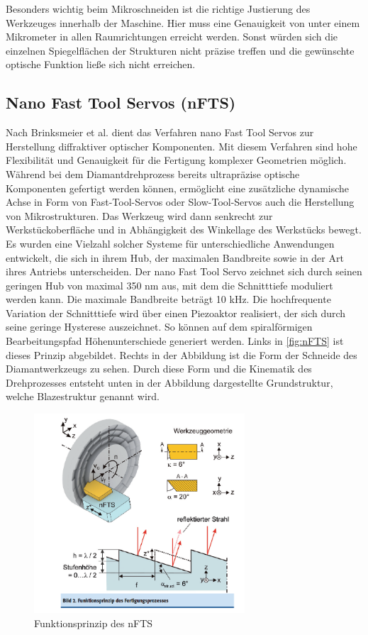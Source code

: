 \documentclass[12pt,a4paper,bibliography=totocnumbered,listof=totocnumbered]{scrartcl}
\begin{document}
\break
Besonders wichtig beim Mikroschneiden ist die richtige Justierung des Werkzeuges innerhalb der Maschine. Hier muss eine Genauigkeit von unter einem Mikrometer in allen Raumrichtungen erreicht werden. Sonst würden sich die einzelnen Spiegelflächen der Strukturen nicht präzise treffen und die gewünschte optische Funktion ließe sich nicht erreichen.




\subsection{Nano Fast Tool Servos (nFTS)}
Nach Brinksmeier et al. \cite{Diadreh} dient das Verfahren nano Fast Tool Servos zur Herstellung diffraktiver optischer Komponenten. Mit diesem Verfahren sind hohe Flexibilität und Genauigkeit für die Fertigung komplexer Geometrien möglich. 
Während bei dem Diamantdrehprozess bereits ultrapräzise optische Komponenten gefertigt werden können, ermöglicht eine zusätzliche dynamische Achse in Form von Fast-Tool-Servos oder Slow-Tool-Servos auch die Herstellung von Mikrostrukturen. Das Werkzeug wird dann senkrecht zur Werkstückoberfläche und in Abhängigkeit des Winkellage des Werkstücks bewegt. Es wurden eine Vielzahl solcher Systeme für unterschiedliche Anwendungen entwickelt, die sich in ihrem Hub, der maximalen Bandbreite sowie in der Art ihres Antriebs unterscheiden. Der nano Fast Tool Servo zeichnet sich durch seinen geringen Hub von maximal 350 nm aus, mit dem die Schnitttiefe moduliert werden kann. Die maximale Bandbreite beträgt 10 kHz. Die hochfrequente Variation der Schnitttiefe wird über einen Piezoaktor realisiert, der sich durch seine geringe Hysterese auszeichnet. So können auf dem spiralförmigen Bearbeitungspfad Höhenunterschiede generiert werden. Links in \autoref{fig:nFTS} ist dieses Prinzip abgebildet. Rechts in der Abbildung ist die Form der Schneide des Diamantwerkzeugs zu sehen. Durch diese Form und die Kinematik des Drehprozesses entsteht unten in der Abbildung dargestellte Grundstruktur, welche Blazestruktur genannt wird. 
\begin{figure}[htbp]
\centering 
\includegraphics[width=0.7\textwidth]{nFTS.PNG}
\caption {Funktionsprinzip des nFTS \cite{Diadreh}}
\label{fig:nFTS}
\end{figure}
\end{document}
